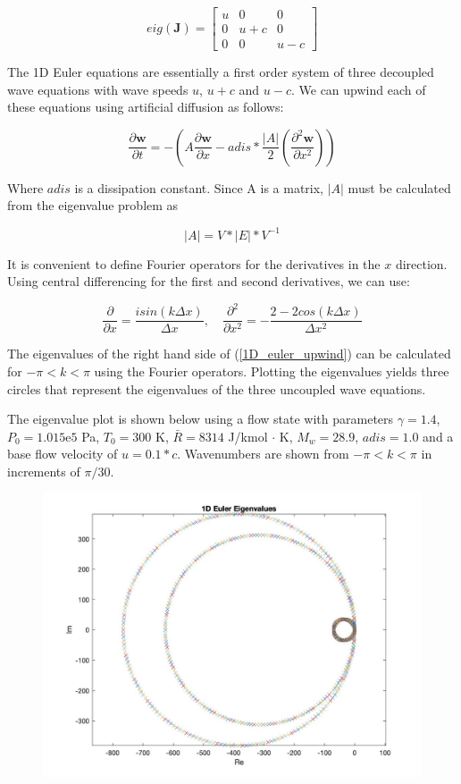 \documentclass[10pt]{article}
\begin{document}
		$$eig(\mathbf{J}) = 
		\begin{bmatrix}
			u & 0 & 0 \\
			0 & u+c & 0 \\
			0 & 0 & u-c
		\end{bmatrix}$$

	The 1D Euler equations are essentially a first order system of three decoupled wave equations with wave speeds $u$, $u+c$ and $u-c$. We can upwind each of these equations using artificial diffusion as follows:
	
	\begin{equation} \label{1D_euler_upwind}
		\frac{\partial \mathbf{w}}{\partial t} = - \left( A \frac{\partial \mathbf{w}}{\partial x} - adis * \frac{|A|}{2} \left( \frac{\partial^2 \mathbf{w}}{\partial x^2} \right) \right)
	\end{equation}

	Where $adis$ is a dissipation constant. Since A is a matrix, $|A|$ must be calculated from the eigenvalue problem as
	
	\begin{equation}
		|A| = V*|E|*V^{-1}
	\end{equation}

	It is convenient to define Fourier operators for the derivatives in the $x$ direction. Using central differencing for the first and second derivatives, we can use:
	
	$$
	\frac{\partial}{\partial x} = \frac{i sin(k \Delta x)}{\Delta x}
	, \quad
	\frac{\partial^2}{\partial x^2} = - \frac{2-2cos(k \Delta x)}{\Delta x^2}
	$$
	
	The eigenvalues of the right hand side of (\ref{1D_euler_upwind}) can be calculated for $-\pi < k < \pi$ using the Fourier operators. Plotting the eigenvalues yields three circles that represent the eigenvalues of the three uncoupled wave equations.
	
	The eigenvalue plot is shown below using a flow state with parameters $\gamma = 1.4$, $P_0 = 1.015\mathrm{e}5$ Pa, $T_0 = 300$ K, $\bar{R} = 8314$ J/kmol $\cdot$ K, $M_w = 28.9$, $adis = 1.0$ and a base flow velocity of $u=0.1*c$. Wavenumbers are shown from $-\pi<k<\pi$ in increments of $\pi/30$.
	
	\begin{figure}[h]
		\includegraphics[width=12cm]{1D_euler_eig}
		\centering
	\end{figure}
	
\end{document}
